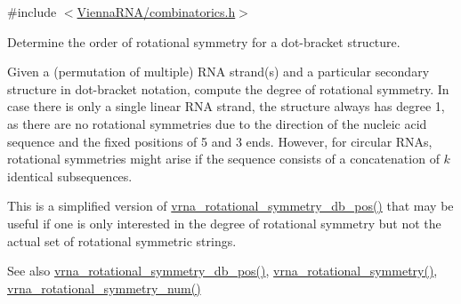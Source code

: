 {\ttfamily \#include $<$\mbox{\hyperlink{combinatorics_8h}{Vienna\+R\+N\+A/combinatorics.\+h}}$>$}



Determine the order of rotational symmetry for a dot-\/bracket structure. 

Given a (permutation of multiple) R\+NA strand(s) and a particular secondary structure in dot-\/bracket notation, compute the degree of rotational symmetry. In case there is only a single linear R\+NA strand, the structure always has degree 1, as there are no rotational symmetries due to the direction of the nucleic acid sequence and the fixed positions of 5\textquotesingle{} and 3\textquotesingle{} ends. However, for circular R\+N\+As, rotational symmetries might arise if the sequence consists of a concatenation of $k$ identical subsequences.

This is a simplified version of \mbox{\hyperlink{group__combinatorics__utils_ga2a4227ebe28dbc7ad55444a3a1bf7119}{vrna\+\_\+rotational\+\_\+symmetry\+\_\+db\+\_\+pos()}} that may be useful if one is only interested in the degree of rotational symmetry but not the actual set of rotational symmetric strings.

\begin{DoxySeeAlso}{See also}
\mbox{\hyperlink{group__combinatorics__utils_ga2a4227ebe28dbc7ad55444a3a1bf7119}{vrna\+\_\+rotational\+\_\+symmetry\+\_\+db\+\_\+pos()}}, \mbox{\hyperlink{group__combinatorics__utils_gae1dec02c4b63f303ce06a9293d316762}{vrna\+\_\+rotational\+\_\+symmetry()}}, \mbox{\hyperlink{group__combinatorics__utils_gac51464b5281833a58c25f9447252c495}{vrna\+\_\+rotational\+\_\+symmetry\+\_\+num()}}
\end{DoxySeeAlso}

